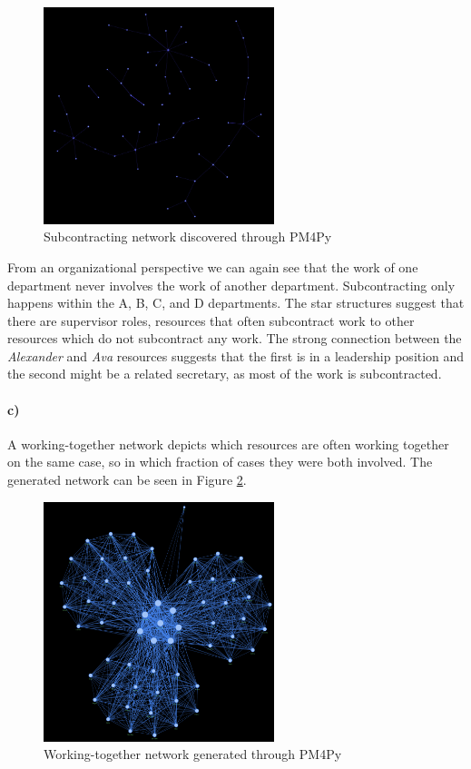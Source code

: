 \documentclass[12pt]{report}
\begin{document}
\begin{figure}[h]
    \centering
    \includegraphics[width=0.6\textwidth]{figures/q2_subcontracting.png}
    \caption{Subcontracting network discovered through PM4Py}
    \label{fig:figures-q2_subcontracting-png}
\end{figure}

From an organizational perspective we can again see that the work of one department never involves the work of another department. Subcontracting only happens within the A, B, C, and D departments. The star structures suggest that there are supervisor roles, resources that often subcontract work to other resources which do not subcontract any work. The strong connection between the \emph{Alexander} and \emph{Ava} resources suggests that the first is in a leadership position and the second might be a related secretary, as most of the work is subcontracted.

\paragraph{c)} 

A working-together network depicts which resources are often working together on the same case, so in which fraction of cases they were both involved. The generated network can be seen in Figure \ref{fig:figures-q2_working_together-png}.

\begin{figure}[h]
    \centering
    \includegraphics[width=0.6\textwidth]{figures/q2_working_together.png}
    \caption{Working-together network generated through PM4Py}
    \label{fig:figures-q2_working_together-png}
\end{figure}
\end{document}
